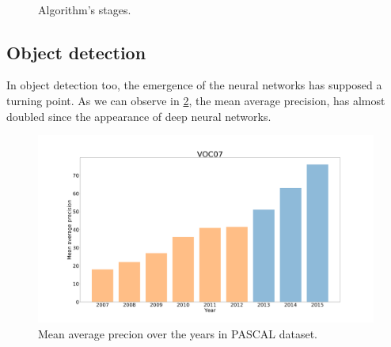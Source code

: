 \documentclass[12pt, a4paper, titlepage,twoside,openright]{article}
\begin{document}
\begin{figure}[H]
		
\centering

\\


\caption{Algorithm's stages.}
\label{stepsAlgo}
\end{figure}

\subsection{Object detection}\label{trackingBounding}






In object detection too, the emergence of the neural networks has supposed a turning point. As we can observe in \ref{deepObjet}, the mean average precision, has almost doubled since the appearance of deep neural networks.


\begin{figure}[H]
\centering         
\includegraphics[width=0.7\linewidth]{intro/figure_1-22.png}
\caption{Mean average precion over the years in PASCAL dataset.} \label{deepObjet}
\end{figure}
\end{document}
